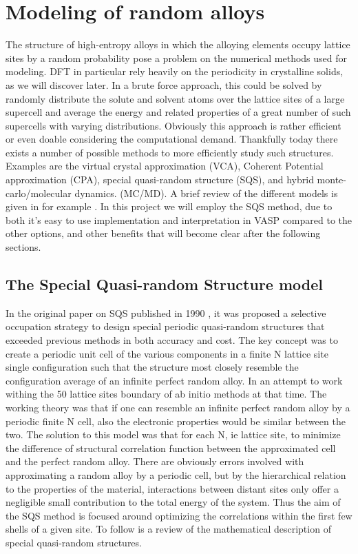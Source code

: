 \chapter{Modeling of random alloys}
\label{sec:SQS}

The structure of high-entropy alloys in which the alloying elements occupy lattice sites by a random probability pose a problem on the numerical methods used for modeling. DFT in particular rely heavily on the periodicity in crystalline solids, as we will discover later. 
In a brute force approach, this could be solved by randomly distribute the solute and solvent atoms over the lattice sites of a large supercell and average the energy and related properties of a great number of such supercells with varying distributions. Obviously this approach is rather efficient or even doable considering the computational demand. Thankfully today there exists a number of possible methods to more efficiently study such structures. Examples are the virtual crystal approximation (VCA), Coherent Potential approximation (CPA), special quasi-random structure (SQS), and hybrid monte-carlo/molecular dynamics. (MC/MD). A brief review of the different models is given in for example \cite{sqsIntro}. In this project we will employ the SQS method, due to both it's easy to use implementation and interpretation in VASP compared to the other options, and other benefits that will become clear after the following sections.             

\section{The Special Quasi-random Structure model}
In the original paper on SQS published in 1990 \cite{sqsfull}, it was proposed a selective occupation strategy to design special periodic quasi-random structures that exceeded previous methods in both accuracy and cost. The key concept was to create a periodic unit cell of the various components in a finite N lattice site single configuration such that the structure most closely resemble the configuration average of an infinite perfect random alloy. In an attempt to work withing the 50 lattice sites boundary of ab initio methods at that time. The working theory was that if one can resemble an infinite perfect random alloy by a periodic finite N cell, also the electronic properties would be similar between the two. The solution to this model was that for each N, ie lattice site, to minimize the difference of structural correlation function between the approximated cell and the perfect random alloy. There are obviously errors involved with approximating a random alloy by a periodic cell, but by the hierarchical relation to the properties of the material, interactions between distant sites only offer a negligible small contribution to the total energy of the system. Thus the aim of the SQS method is focused around optimizing the correlations within the first few shells of a given site. To follow is a review of the mathematical description of special quasi-random structures.

